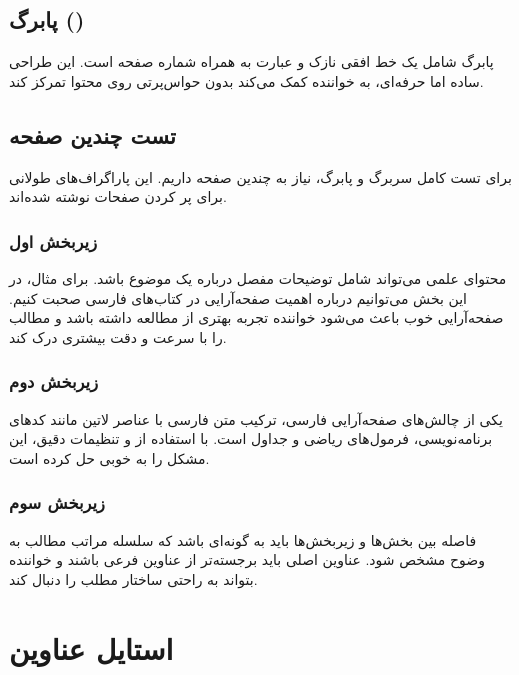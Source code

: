 \documentclass{matinbook}
\begin{document}
\section{پابرگ ()}

پابرگ شامل یک خط افقی نازک و عبارت  به همراه
شماره صفحه است. این طراحی ساده اما حرفه‌ای، به خواننده
کمک می‌کند بدون حواس‌پرتی روی محتوا تمرکز کند.

\section{تست چندین صفحه}

برای تست کامل سربرگ و پابرگ، نیاز به چندین صفحه داریم.
این پاراگراف‌های طولانی برای پر کردن صفحات نوشته شده‌اند.

\subsection{زیربخش اول}

محتوای علمی می‌تواند شامل توضیحات مفصل درباره یک موضوع باشد.
برای مثال، در این بخش می‌توانیم درباره اهمیت صفحه‌آرایی
در کتاب‌های فارسی صحبت کنیم. صفحه‌آرایی خوب باعث می‌شود
خواننده تجربه بهتری از مطالعه داشته باشد و مطالب را
با سرعت و دقت بیشتری درک کند.

\subsection{زیربخش دوم}

یکی از چالش‌های صفحه‌آرایی فارسی، ترکیب متن فارسی با
عناصر لاتین مانند کدهای برنامه‌نویسی، فرمول‌های ریاضی
و جداول است.  با استفاده از 
و تنظیمات دقیق، این مشکل را به خوبی حل کرده است.

\subsection{زیربخش سوم}

فاصله بین بخش‌ها و زیربخش‌ها باید به گونه‌ای باشد که
سلسله مراتب مطالب به وضوح مشخص شود. عناوین اصلی باید
برجسته‌تر از عناوین فرعی باشند و خواننده بتواند
به راحتی ساختار مطلب را دنبال کند.

\chapter{استایل عناوین}
\end{document}

